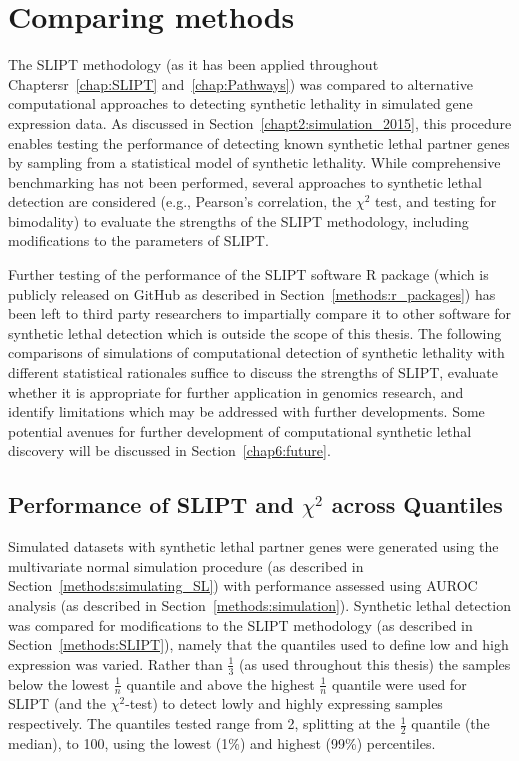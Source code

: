 \section{Comparing methods} \label{chapt5:compare_ methods}

The \gls{SLIPT} methodology (as it has been applied throughout Chaptersr~\ref{chap:SLIPT} and~\ref{chap:Pathways}) was compared to alternative computational approaches to detecting synthetic lethality in simulated gene expression data. As discussed in Section~\ref{chapt2:simulation_2015}, this procedure enables testing the performance of detecting known synthetic lethal partner genes by sampling from a statistical model of synthetic lethality. While comprehensive benchmarking has not been performed, several approaches to synthetic lethal detection are considered (e.g., Pearson's correlation, the $\chi^2$ test, and testing for bimodality) to evaluate the strengths of the SLIPT methodology, including modifications to the parameters of \gls{SLIPT}.

Further testing of the performance of the SLIPT software R package (which is publicly released on GitHub as described in Section~\ref{methods:r_packages}) has been left to third party researchers to impartially compare it to other software for synthetic lethal detection which is outside the scope of this thesis. The following comparisons of simulations of computational detection of synthetic lethality with different statistical rationales suffice to discuss the strengths of \gls{SLIPT}, evaluate whether it is appropriate for further application in genomics research, and identify limitations which may be addressed with further developments. Some potential avenues for further development of computational synthetic lethal discovery will be discussed in Section~\ref{chap6:future}.

\subsection{Performance of SLIPT and $\chi^2$ across Quantiles}
\label{chapt5:compare_chisq}

Simulated datasets with synthetic lethal partner genes were generated using the multivariate normal simulation procedure (as described in Section~\ref{methods:simulating_SL}) with performance assessed using \gls{AUROC} analysis (as described in Section~\ref{methods:simulation}). Synthetic lethal detection was compared for modifications to the \gls{SLIPT} methodology (as described in Section~\ref{methods:SLIPT}), namely that the quantiles used to define low and high expression was varied. Rather than $\frac{1}{3}$ (as used throughout this thesis) the samples below the lowest $\frac{1}{n}$ quantile and above the highest $\frac{1}{n}$ quantile were used for \gls{SLIPT} (and the $\chi^2$-test) to detect lowly and highly expressing samples respectively. The quantiles tested range from 2, splitting at the $\frac{1}{2}$ quantile (the median), to 100, using the lowest (1\%) and highest (99\%) percentiles.

